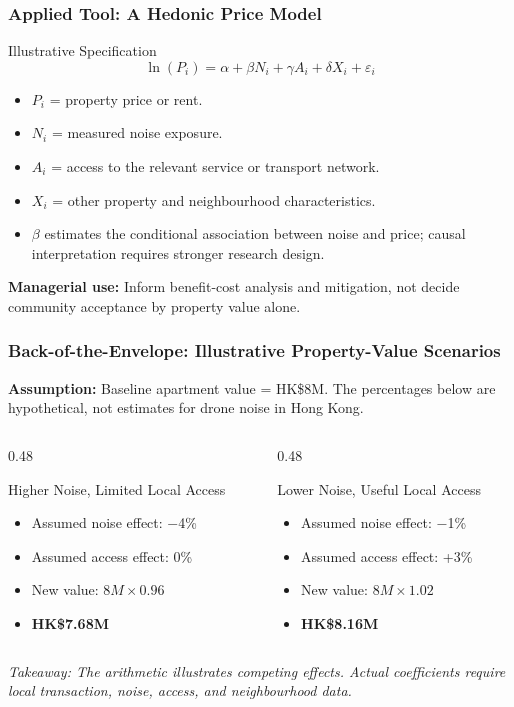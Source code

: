 \documentclass{beamer}
\begin{document}
\begin{frame}[t]
\frametitle{Applied Tool: A Hedonic Price Model}
\begin{block}{Illustrative Specification}
\[
\ln(P_i)=\alpha+\beta N_i+\gamma A_i+\delta X_i+\varepsilon_i
\]
\end{block}
\begin{itemize}
\item $P_i$ = property price or rent.
\item $N_i$ = measured noise exposure.
\item $A_i$ = access to the relevant service or transport network.
\item $X_i$ = other property and neighbourhood characteristics.
\item $\beta$ estimates the conditional association between noise and price; causal interpretation requires stronger research design.
\end{itemize}
\textbf{Managerial use:} Inform benefit-cost analysis and mitigation, not decide community acceptance by property value alone.
\end{frame}

\begin{frame}[t,shrink=12]
\frametitle{Back-of-the-Envelope: Illustrative Property-Value Scenarios}
\textbf{Assumption:} Baseline apartment value = HK\$8M. The percentages below are hypothetical, not estimates for drone noise in Hong Kong.
\begin{columns}[T]
\begin{column}{0.48\textwidth}\begin{block}{Higher Noise, Limited Local Access}
\begin{itemize}
\item Assumed noise effect: $-$4\%
\item Assumed access effect: 0\%
\item New value: $8M\times0.96$
\item \textbf{HK\$7.68M}
\end{itemize}\end{block}\end{column}
\begin{column}{0.48\textwidth}\begin{block}{Lower Noise, Useful Local Access}
\begin{itemize}
\item Assumed noise effect: $-$1\%
\item Assumed access effect: +3\%
\item New value: $8M\times1.02$
\item \textbf{HK\$8.16M}
\end{itemize}\end{block}\end{column}
\end{columns}
\textit{Takeaway: The arithmetic illustrates competing effects. Actual coefficients require local transaction, noise, access, and neighbourhood data.}
\end{frame}
\end{document}

